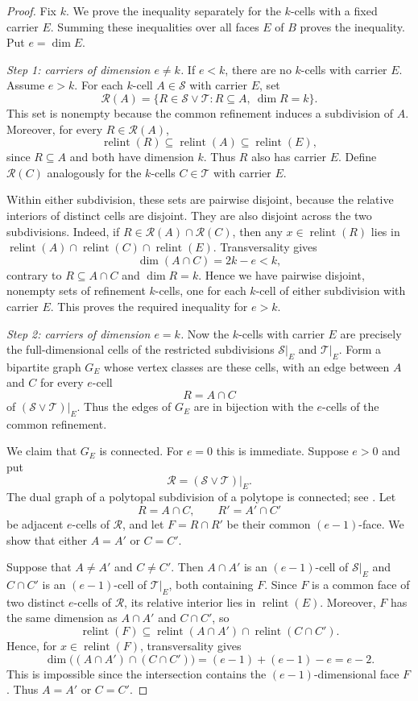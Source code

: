 \documentclass[a4paper,12pt]{amsart}
\theoremstyle{definition}
\theoremstyle{remark}
\newcommand{\relint}{\operatorname{relint}}
\begin{document}
\begin{proof}
Fix $k$. 
We prove the inequality separately for the $k$-cells with a fixed carrier $E$. 
Summing these inequalities over all faces $E$ of $B$ proves the inequality. 
Put $e=\dim E$.

\noindent\emph{Step 1: carriers of dimension $e\neq k$.}
If $e<k$, there are no $k$-cells with carrier $E$. 
Assume $e>k$.
For each $k$-cell $A\in\mathcal S$ with carrier $E$, set
\[
 \mathcal R(A)=  \{R\in\mathcal S\vee\mathcal T:R\subseteq A,\ \dim R=k\}.
\]
This set is nonempty because the common refinement induces a subdivision of $A$. 
Moreover, for every $R\in\mathcal R(A)$,
\[
 \relint(R)\subseteq\relint(A)\subseteq\relint(E),
\]
since $R\subseteq A$ and both have dimension $k$. 
Thus $R$ also has carrier $E$. Define $\mathcal R(C)$ analogously for the $k$-cells $C\in\mathcal T$ with carrier $E$.

Within either subdivision, these sets are pairwise disjoint, because the relative interiors of distinct cells are disjoint.
They are also disjoint across the two subdivisions. 
Indeed, if $R\in\mathcal R(A)\cap\mathcal R(C)$, then any $x\in\relint(R)$ lies in
$\relint(A)\cap\relint(C)\cap\relint(E)$. 
Transversality gives
\[
 \dim(A\cap C)=2k-e<k,
\]
contrary to $R\subseteq A\cap C$ and $\dim R=k$.
Hence we have pairwise disjoint, nonempty sets of refinement $k$-cells, one for each $k$-cell of either subdivision with carrier $E$. 
This proves the required inequality for $e>k$. 

\noindent\emph{Step 2: carriers of dimension $e=k$.}
Now the $k$-cells with carrier $E$ are precisely the full-dimensional cells of the restricted subdivisions $\mathcal S|_E$ and $\mathcal T|_E$. 
Form a bipartite graph $G_E$ whose vertex classes are these cells, with an edge  between $A$ and $C$ for every $e$-cell 
\[
 R=A\cap C
\]
of $(\mathcal S\vee\mathcal T)|_E$. 
Thus the edges of $G_E$ are in bijection with the $e$-cells of the common refinement.

We claim that $G_E$ is connected. For $e=0$ this is immediate. 
Suppose $e>0$ and put
\[
 \mathcal R=(\mathcal S\vee\mathcal T)|_E.
\]
The dual graph of a polytopal subdivision of a polytope is connected; see \cite[Lemma~2]{CJK25}. 
Let
\[
 R=A\cap C,\qquad R'=A'\cap C'
\]
be adjacent $e$-cells of $\mathcal R$, and let $F=R\cap R'$ be their common $(e-1)$-face. 
We show that either $A=A'$ or $C=C'$.

Suppose that $A\neq A'$ and $C\neq C'$. 
Then $A\cap A'$ is an $(e-1)$-cell of $\mathcal S|_E$ and $C\cap C'$ is an $(e-1)$-cell of $\mathcal T|_E$, both containing $F$. 
Since $F$ is a common face of two distinct $e$-cells of $\mathcal R$, its relative interior lies in $\relint(E)$. 
Moreover, $F$ has the same dimension as $A\cap A'$ and $C\cap C'$, so
\[
 \relint(F)\subseteq\relint(A\cap A')\cap\relint(C\cap C').
\]
Hence, for $x\in\relint(F)$, transversality gives
\[
 \dim\bigl((A\cap A')\cap(C\cap C')\bigr)  =(e-1)+(e-1)-e=e-2.
\]
This is impossible since the intersection contains the $(e-1)$-dimensional face $F$. 
Thus $A=A'$ or $C=C'$.


\end{proof}
\end{document}
